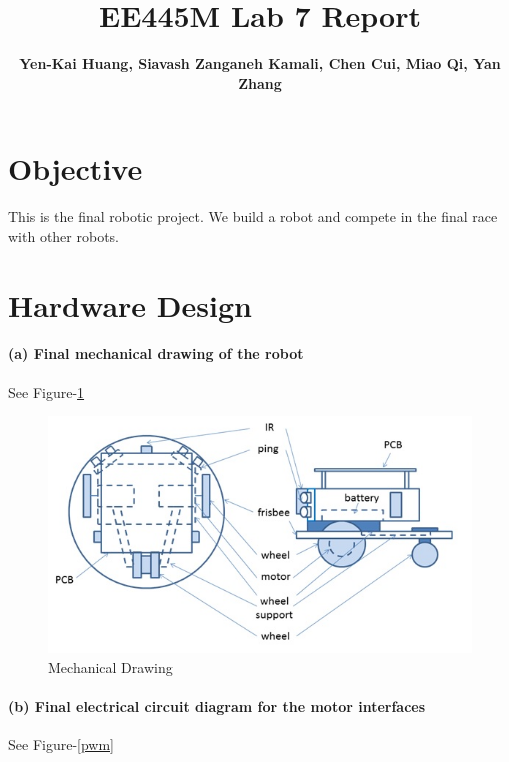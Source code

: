 \documentclass[a4paper]{article}
\newlength{\pic}
\begin{document}
\title{EE445M Lab 7 Report}
\author{\bfseries Yen-Kai Huang, Siavash Zanganeh Kamali, Chen Cui, Miao Qi, Yan Zhang}
\maketitle

\section{Objective} This is the final robotic project. We build a robot and compete in the final race with other robots.

\section{Hardware Design}

\paragraph{(a) Final mechanical drawing of the robot }
See Figure-\ref{mech}

\setlength{\pic}{\textwidth}
\begin{figure}[htp]
\center
\includegraphics[width=\pic]{circuits/mechanical_drawing}
\caption{Mechanical Drawing} \label{mech}
\end{figure}

\paragraph{(b) Final electrical circuit diagram for the motor interfaces }
See Figure-\ref{pwm}
\end{document}
